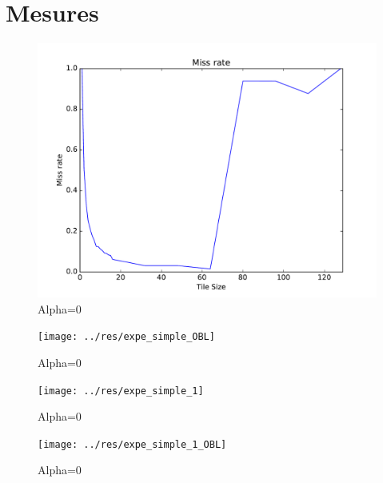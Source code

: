 \documentclass[11pt,a4paper]{article}
\begin{document}
\section{Mesures}
\begin{figure}[htbp]
  \centering
  \includegraphics[width=0.9\linewidth]{../res/expe_simple}
  \caption{Alpha=0}
  \label{fig:0}
\end{figure}
 \begin{figure}[htbp]
   \centering
   \texttt{[image: ../res/expe\_simple\_OBL]}
   \caption{Alpha=0}
   \label{fig:1}
 \end{figure}
\begin{figure}[htbp]
  \centering
  \texttt{[image: ../res/expe\_simple\_1]}
  \caption{Alpha=0}
  \label{fig:0}
\end{figure}
 \begin{figure}[htbp]
   \centering
   \texttt{[image: ../res/expe\_simple\_1\_OBL]}
   \caption{Alpha=0}
   \label{fig:1}
 \end{figure}
\end{document}
